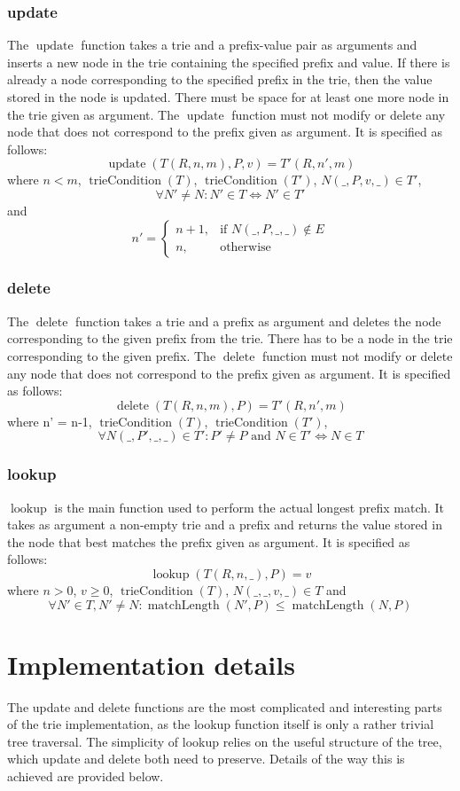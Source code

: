 \documentclass{article}
\DeclareMathOperator{\matchlength}{matchLength}
\DeclareMathOperator{\triecond}{trieCondition}
\DeclareMathOperator{\update}{update}
\DeclareMathOperator{\delete}{delete}
\DeclareMathOperator{\lookup}{lookup}
\begin{document}
\subsubsection{update}
The $\update$ function takes a trie and a prefix-value pair as arguments and
inserts a new node in the trie containing the specified prefix and value. If
there is already a node corresponding to the specified prefix in the trie, then
the value stored in the node is updated. There must be space for at least one
more node in the trie given as argument. The $\update$ function must not modify
or delete any node that does not correspond to the prefix given as argument. It
is specified as follows:
\[
    \update(T(R, n, m), P, v) = T'(R, n', m)
\]
where $n < m$, $\triecond(T)$, $\triecond(T')$, $N(\_, P, v, \_) \in T'$,
\[
    \forall N' \neq N: N' \in T \Leftrightarrow N' \in T'
\]
and
\[
    n'=
    \begin{cases}
    n+1,   & \text{if } N(\_, P, \_, \_) \notin E\\
    n,  & \text{otherwise}
    \end{cases}
\]
\subsubsection{delete}
The $\delete$ function takes a trie and a prefix as argument and deletes the
node corresponding to the given prefix from the trie. There has to be a node in
the trie corresponding to the given prefix. The $\delete$ function must not
modify or delete any node that does not correspond to the prefix given as
argument. It is specified as follows:
\[
    \delete(T(R, n, m), P) = T'(R, n', m)
\]
where n' = n-1, $\triecond(T)$, $\triecond(T')$,
\[
    \forall N(\_, P', \_, \_) \in T': P' \neq P \text{ and }
    N \in T' \Leftrightarrow N \in T
\]
\subsubsection{lookup}
$\lookup$ is the main function used to perform the actual longest prefix match.
It takes as argument a non-empty trie and a prefix and returns the value stored
in the node that best matches the prefix given as argument. It is specified as
follows:
\[
    \lookup(T(R, n, \_), P) = v
\]
where $n > 0$, $v \geq 0$, $\triecond(T)$, $N(\_, \_, v, \_) \in T$ and
\[
    \forall N'\in T, N' \neq N: \matchlength(N', P) \leq \matchlength(N, P)
\]
\section{Implementation details}
The update and delete functions are the most complicated and interesting parts of
the trie implementation, as the lookup function itself is only a rather trivial
tree traversal. The simplicity of lookup relies on the useful structure of the
tree, which update and delete both need to preserve. Details of the way this is
achieved are provided below.
\end{document}
